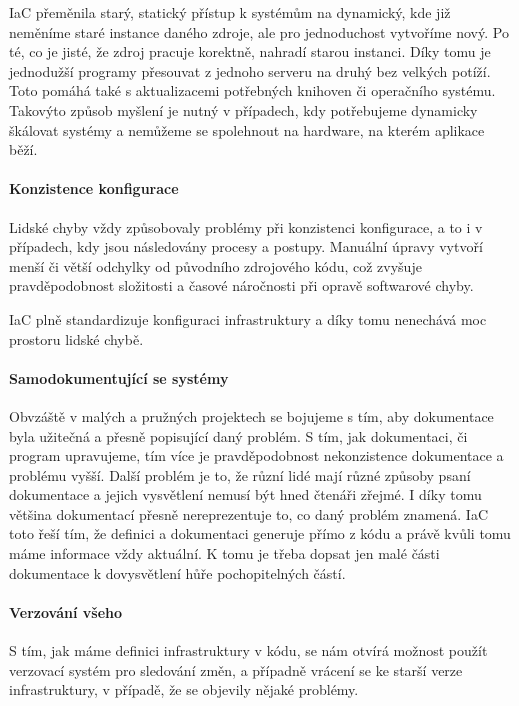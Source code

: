 \documentclass[thesis=M,czech]{FITthesis}[2019/12/23]
\theoremstyle{plain}
\theoremstyle{definition}
\begin{document}
IaC přeměnila starý, statický přístup k systémům na dynamický, kde již neměníme staré instance daného zdroje, ale pro jednoduchost vytvoříme nový. Po té, co je jisté, že zdroj pracuje korektně, nahradí starou instanci. Díky tomu je jednodužší programy přesouvat z jednoho serveru na druhý bez velkých potíží. Toto pomáhá také s aktualizacemi potřebných knihoven či operačního systému. Takovýto způsob myšlení je nutný v případech, kdy potřebujeme dynamicky škálovat systémy a nemůžeme se spolehnout na hardware, na kterém aplikace běží.

\paragraph{Konzistence konfigurace}



Lidské chyby vždy způsobovaly problémy při konzistenci konfigurace, a to i v případech, kdy jsou následovány procesy a postupy. Manuální úpravy vytvoří menší či větší odchylky od původního zdrojového kódu, což zvyšuje pravděpodobnost složitosti a časové náročnosti při opravě softwarové chyby. 

IaC plně standardizuje konfiguraci infrastruktury a díky tomu nenechává moc prostoru lidské chybě.



\paragraph{Samodokumentující se systémy}

Obvzáště v malých a pružných projektech se bojujeme s tím, aby dokumentace byla užitečná a přesně popisující daný problém. S tím, jak dokumentaci, či program upravujeme, tím více je pravděpodobnost nekonzistence dokumentace a problému vyšší. Další problém je to, že různí lidé mají různé způsoby psaní dokumentace a jejich vysvětlení nemusí být hned čtenáři zřejmé. I díky tomu většina dokumentací přesně nereprezentuje to, co daný problém znamená. IaC toto řeší tím, že definici a dokumentaci generuje přímo z kódu a právě kvůli tomu máme informace vždy aktuální. K tomu je třeba dopsat jen malé části dokumentace k dovysvětlení hůře pochopitelných částí.  


\paragraph{Verzování všeho}

S tím, jak máme definici infrastruktury v kódu, se nám otvírá možnost použít verzovací systém pro sledování změn, a případně vrácení se ke starší verze infrastruktury, v případě, že se objevily nějaké problémy.
\end{document}
